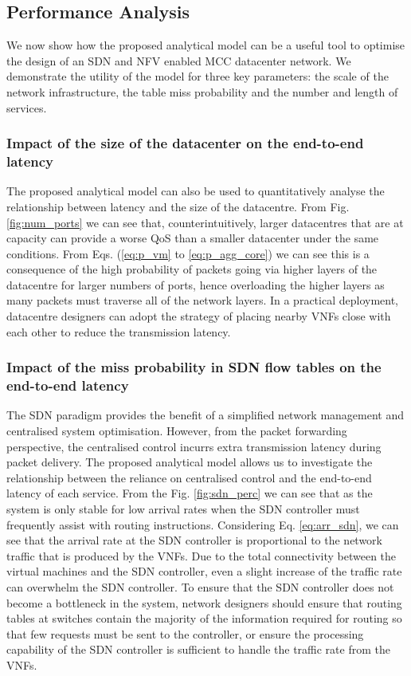 \subsection{Performance Analysis}
We now show how the proposed analytical model can be a useful tool to optimise the design of an SDN and NFV enabled MCC datacenter network. We demonstrate the utility of the model for three key parameters: the scale of the network infrastructure, the table miss probability and the number and length of services.

\subsubsection{Impact of the size of the datacenter on the end-to-end latency}
The proposed analytical model can also be used to quantitatively analyse the relationship between latency and the size of the datacentre. From Fig. \ref{fig:num_ports} we can see that, counterintuitively, larger datacentres that are at capacity can provide a worse QoS than a smaller datacenter under the same conditions. From Eqs. (\ref{eq:p_vm} to \ref{eq:p_agg_core}) we can see this is a consequence of the high probability of packets going via higher layers of the datacentre for larger numbers of ports, hence overloading the higher layers as many packets must traverse all of the network layers. In a practical deployment, datacentre designers can adopt the strategy of placing nearby VNFs close with each other to reduce the transmission latency.

\subsubsection{Impact of the miss probability in SDN flow tables on the end-to-end latency}
The SDN paradigm provides the benefit of a simplified network management and centralised system optimisation. However, from the packet forwarding perspective, the centralised control incurrs extra transmission latency during packet delivery. The proposed analytical model allows us to investigate the relationship between the reliance on centralised control and the end-to-end latency of each service. From the Fig. \ref{fig:sdn_perc} we can see that as the system is only stable for low arrival rates when the SDN controller must frequently assist with routing instructions. Considering Eq. \ref{eq:arr_sdn}, we can see that the arrival rate at the SDN controller is proportional to the network traffic that is produced by the VNFs. Due to the total connectivity between the virtual machines and the SDN controller, even a slight increase of the traffic rate can overwhelm the SDN controller. To ensure that the SDN controller does not become a bottleneck in the system, network designers should ensure that routing tables at switches contain the majority of the information required for routing so that few requests must be sent to the controller, or ensure the processing capability of the SDN controller is sufficient to handle the traffic rate from the VNFs.

